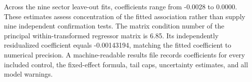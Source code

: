Across the nine sector leave-out fits, coefficients range from -0.0028 to 0.0000. These estimates assess concentration of the fitted association rather than supply nine independent confirmation tests. The matrix condition number of the principal within-transformed regressor matrix is 6.85. Its independently residualized coefficient equals -0.00143194, matching the fitted coefficient to numerical precision. A machine-readable results file records coefficients for every included control, the fixed-effect formula, tail caps, uncertainty estimates, and all model warnings.
